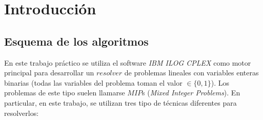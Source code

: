 \section{Introducción}

\subsection{Esquema de los algoritmos}

En este trabajo práctico se utiliza el software \emph{IBM\textsuperscript{\textregistered} ILOG\textsuperscript{\textregistered} CPLEX\textsuperscript{\textregistered}} como motor principal para desarrollar un $resolver$ de problemas lineales con variables enteras binarias (todas las variables del problema toman el valor $\in \{0,1\}$). Los problemas de este tipo suelen llamarse $MIP$s (\emph{Mixed Integer Problems}). En particular, en este trabajo, se utilizan tres tipo de técnicas diferentes para resolverlos:

